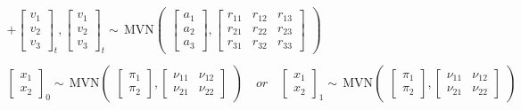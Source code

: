 \documentclass[12pt,]{book}
\begin{document}
\begin{gather*}
+ \begin{bmatrix}v_1\\ v_2\\ v_3\end{bmatrix}_t,
\begin{bmatrix}v_1\\ v_2\\ v_3\end{bmatrix}_t \sim \,\text{MVN}\begin{pmatrix}\begin{bmatrix}a_1\\ a_2\\ a_3\end{bmatrix},
 \begin{bmatrix}r_{11}&r_{12}&r_{13}\\r_{21}&r_{22}&r_{23}\\r_{31}&r_{32}&r_{33}\end{bmatrix} \end{pmatrix}  \\
\\
\begin{bmatrix}x_1\\ x_2\end{bmatrix}_0 \sim \,\text{MVN}\begin{pmatrix}\begin{bmatrix}\pi_1\\ \pi_2\end{bmatrix},\begin{bmatrix}\nu_{11}&\nu_{12}\\ \nu_{21}&\nu_{22}\end{bmatrix} \end{pmatrix} \quad 
or\quad 
\begin{bmatrix}x_1\\ x_2\end{bmatrix}_1 \sim \,\text{MVN}\begin{pmatrix}\begin{bmatrix}\pi_1\\ \pi_2\end{bmatrix},\begin{bmatrix}\nu_{11}&\nu_{12}\\ \nu_{21}&\nu_{22}\end{bmatrix} \end{pmatrix} 
\end{gather*}
\end{document}
